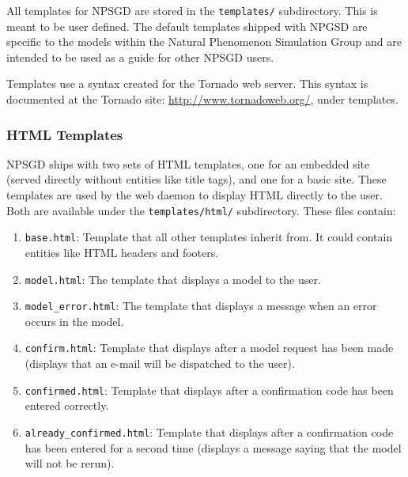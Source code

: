 \documentclass{article}
\newcommand{\mpath}[1]{\texttt{#1}}
\begin{document}
All templates for NPSGD are stored in the \mpath{templates/} subdirectory. This
is meant to be user defined. The default templates shipped with NPGSD are 
specific to the models within the Natural Phenomenon Simulation Group and are
intended to be used as a guide for other NPSGD users.

Templates use a syntax created for the Tornado web server. This syntax is
documented at the Tornado site: \url{http://www.tornadoweb.org/}, under
templates.

\subsubsection{HTML Templates}
NPSGD ships with two sets of HTML templates, one for an embedded site (served
directly without entities like title tags), and one for a basic site. These
templates are used by the web daemon to display HTML directly to the user. Both are
available under the \mpath{templates/html/} subdirectory. These files contain:
\begin{enumerate}
    \item \texttt{base.html}: Template that all other templates inherit from.
    It could contain entities like HTML headers and footers.

    \item \texttt{model.html}: The template that displays a model to the user.

    \item \texttt{model\_error.html}: The template that displays a message when
    an error occurs in the model.

    \item \texttt{confirm.html}: Template that displays after a model request has
    been made (displays that an e-mail will be dispatched to the user).

    \item \texttt{confirmed.html}: Template that displays after a confirmation code
    has been entered correctly.

    \item \texttt{already\_confirmed.html}: Template that displays after a
    confirmation code has been entered for a second time (displays a
    message saying that the model will not be rerun).
\end{enumerate}
\end{document}
